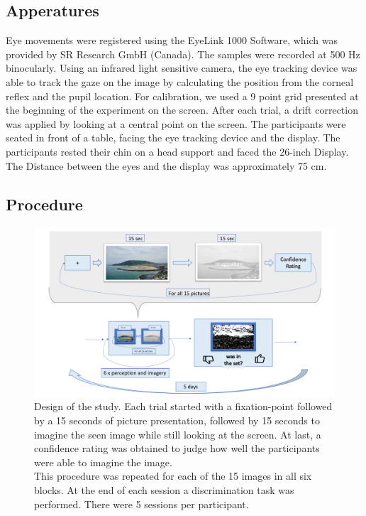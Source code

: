 \documentclass[a4paper,man,natbib,floatsintext]{apa6}
\begin{document}
\subsection{Apperatures} 
Eye movements were registered using the EyeLink 1000 Software, which was provided by SR Research GmbH (Canada). The samples were recorded at 500 Hz binocularly. Using an infrared light sensitive camera, the eye tracking device was able to track the gaze on the image by calculating the position from the corneal reflex and the pupil location. For calibration, we used a 9 point grid presented at the beginning of the experiment on the screen. After each trial, a drift correction was applied by looking at a central point on the screen. The participants were seated in front of a table, facing the eye tracking device and the display. The participants rested their chin on a head support and faced the 26-inch Display. The Distance between the eyes and the display was approximately 75 cm. \\


\subsection{Procedure} 
\begin{figure}
\centering
\includegraphics[width=1\textwidth]{Procedure.pdf}
\caption[Procedure]{\label{fig:Procedure} Design of the study. Each trial started with a fixation-point followed by a 15 seconds of picture presentation, followed by 15 seconds to imagine the seen image while still looking at the screen. At last, a confidence rating was obtained to judge how well the participants were able to imagine the image. \\ This procedure was repeated for each of the 15 images in all six blocks. At the end of each session a discrimination task was performed. There were 5 sessions per participant. }
\end{figure}
\end{document}
